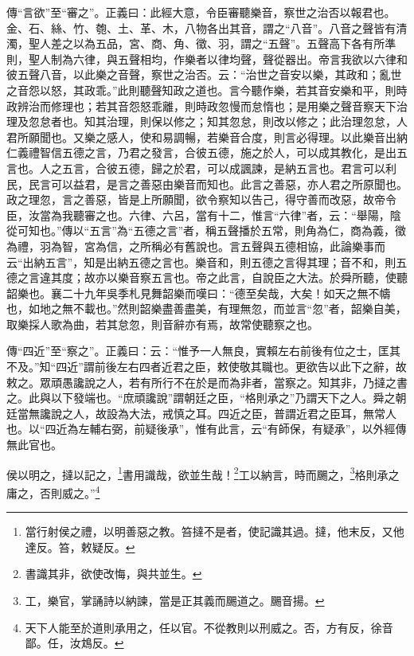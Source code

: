 {\noindent\zhuan{}\fzbyks 傳“言欲”至“審之”。正義曰：此經大意，令臣審聽樂音，察世之治否以報君也。金、石、絲、竹、匏、土、革、木，八物各出其音，謂之“八音”。八音之聲皆有清濁，聖人差之以為五品，宮、商、角、徵、羽，謂之“五聲”。五聲高下各有所準則，聖人制為六律，與五聲相均，作樂者以律均聲，聲從器出。帝言我欲以六律和彼五聲八音，以此樂之音聲，察世之治否。云：“治世之音安以樂，其政和；亂世之音怨以怒，其政乖。”此則聽聲知政之道也。言今聽作樂，若其音安樂和平，則時政辨治而修理也；若其音怨怒乖離，則時政忽慢而怠惰也；是用樂之聲音察天下治理及忽怠者也。知其治理，則保以修之；知其忽怠，則改以修之；此治理忽怠，人君所願聞也。又樂之感人，使和易調暢，若樂音合度，則言必得理。以此樂音出納仁義禮智信五德之言，乃君之發言，合彼五德，施之於人，可以成其教化，是出五言也。人之五言，合彼五德，歸之於君，可以成諷諫，是納五言也。君言可以利民，民言可以益君，是言之善惡由樂音而知也。此言之善惡，亦人君之所原聞也。政之理忽，言之善惡，皆是上所願聞，欲令察知以告己，得守善而改惡，故帝令臣，汝當為我聽審之也。六律、六呂，當有十二，惟言“六律”者，云：“舉陽，陰從可知也。”傳以“五言”為“五德之言”者，稱五聲播於五常，則角為仁，商為義，徵為禮，羽為智，宮為信，之所稱必有舊說也。言五聲與五德相協，此論樂事而云“出納五言”，知是出納五德之言也。樂音和，則五德之言得其理；音不和，則五德之言違其度；故亦以樂音察五言也。帝之此言，自說臣之大法。於舜所聽，使聽韶樂也。襄二十九年吳季札見舞韶樂而嘆曰：“德至矣哉，大矣！如天之無不幬也，如地之無不載也。”然則韶樂盡善盡美，有理無忽，而並言“忽”者，韶樂自美，取樂採人歌為曲，若其怠忽，則音辭亦有焉，故常使聽察之也。 \par}

{\noindent\zhuan{}\fzbyks 傳“四近”至“察之”。正義曰：云：“惟予一人無良，實賴左右前後有位之士，匡其不及。”知“四近”謂前後左右四者近君之臣，敕使敬其職也。更欲告以此下之辭，故敕之。眾頑愚讒說之人，若有所行不在於是而為非者，當察之。知其非，乃撻之書之。此與以下發端也。“庶頑讒說”謂朝廷之臣，“格則承之”乃謂天下之人。舜之朝廷當無讒說之人，故設為大法，戒慎之耳。四近之臣，普謂近君之臣耳，無常人也。以“四近為左輔右弼，前疑後承”，惟有此言，云“有師保，有疑承”，以外經傳無此官也。 \par}

侯以明之，撻以記之，\footnote{當行射侯之禮，以明善惡之教。笞撻不是者，使記識其過。撻，他末反，又他達反。笞，敕疑反。}書用識哉，欲並生哉！\footnote{書識其非，欲使改悔，與共並生。}工以納言，時而颺之，\footnote{工，樂官，掌誦詩以納諫，當是正其義而颺道之。颺音揚。}格則承之庸之，否則威之。”\footnote{天下人能至於道則承用之，任以官。不從教則以刑威之。否，方有反，徐音鄙。任，汝鴆反。}

